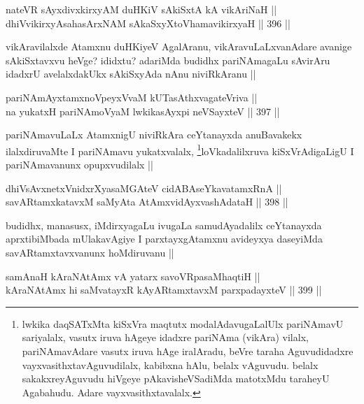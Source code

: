 
\begin{shl}
nateVR sAyxdivxkirxyAM duHKiV sAkiSxtA kA vikAriNaH || \\
dhiVvikirxyAsahasArxNAM sAkaSxyXtoV\s hamavikirxyaH ||  396 ||  
\end{shl}

\begin{artha}
vikAravilalxde Atamxnu duHKiyeV AgalAranu, vikAravuLaLxvanAdare avanige sAkiSxtavxvu heVge? ididxtu? adariMda budidhx pariNAmagaLu sAvirAru idadxrU avelalxdakUkx sAkiSxyAda nAnu niviRkAranu ||
\end{artha}

\begin{shl}
pariNAmAyxtamxnoV\s peyxVvaM kUTasAthxvagateVriva || \\
na yukatxH pariNAmoV\s yaM lwkikasAyxpi neVSayxteV ||  397 ||  
\end{shl}

\begin{artha}
pariNAmavuLaLx AtamxnigU niviRkAra ceYtanayxda anuBavakekx ilalxdiruvaMte I pariNAmavu yukatxvalalx, \footnote{lwkika daqSATxMta kiSxVra maqtutx modalAdavugaLalUlx pariNAmavU sariyalalx, vasutx iruva hAgeye idadxre pariNAma (vikAra) vilalx, pariNAmavAdare vasutx iruva hAge iralAradu, beVre taraha Aguvudidadxre vayxvasithxtavAguvudilalx, kabibxna hAlu, belalx vAguvudu. belalx sakakxreyAguvudu hiVgeye pAkavisheVSadiMda matotxMdu taraheyU Agabahudu. Adare vayxvasithxtavalalx.}loVkadalilxruva kiSxVrAdigaLigU I pariNAmavanunx opupxvudilalx ||
\end{artha}

\begin{shl}
dhiVsAvxnetxVnidxrXyasaMGAteV cidABAseYkavatamxRnA || \\
savARtamxkatavxM saMyAta AtAmx\s vidAyxvashAdataH ||  398 ||  
\end{shl}

\begin{artha}
budidhx, manasusx, iMdirxyagaLu ivugaLa samudAyadalilx ceYtanayxda aprxtibiMbada mUlakavAgiye I parxtayxgAtamxnu avideyxya daseyiMda savARtamxtavxvanunx hoMdiruvanu ||
\end{artha}

\begin{shl}
samAnaH kAraNAtAmx vA yatarx savoVRpasaMhaqtiH || \\
kAraNAtAmx hi saMvatayxR kAyARtamxtavxM parxpadayxteV ||  399 || 
\end{shl}

